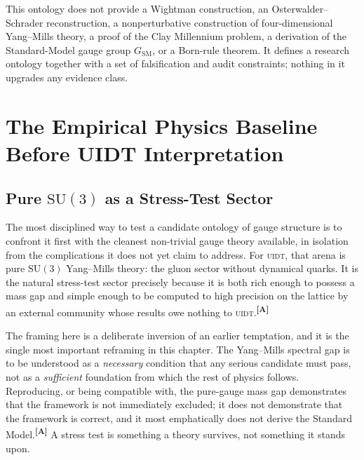 \documentclass[12pt,a4paper,twoside]{article}
\theoremstyle{plain}
\theoremstyle{definition}
\theoremstyle{remark}
\newcommand{\UIDT}{\textsc{uidt}}
\newcommand{\catmark}[1]{\textsuperscript{\textsf{\textbf{[#1]}}}}
\begin{document}
\begin{governancebox}
This ontology does not provide a Wightman construction, an
Osterwalder--Schrader reconstruction, a nonperturbative construction of
four-dimensional Yang--Mills theory, a proof of the Clay Millennium problem,
a derivation of the Standard-Model gauge group $G_{\mathrm{SM}}$, or a
Born-rule theorem. It defines a research ontology together with a set of
falsification and audit constraints; nothing in it upgrades any evidence
class.
\end{governancebox}

\section{The Empirical Physics Baseline Before UIDT Interpretation}
\label{sec:empirical-baseline}

\subsection{Pure \texorpdfstring{$\mathrm{SU}(3)$}{SU(3)} as a Stress-Test Sector}
\label{subsec:su3-stress-test}

The most disciplined way to test a candidate ontology of gauge structure is to confront it first with the cleanest non-trivial gauge theory available, in isolation from the complications it does not yet claim to address. For \UIDT, that arena is pure $\mathrm{SU}(3)$ Yang--Mills theory: the gluon sector without dynamical quarks. It is the natural stress-test sector precisely because it is both rich enough to possess a mass gap and simple enough to be computed to high precision on the lattice by an external community whose results owe nothing to \UIDT.\catmark{A}

The framing here is a deliberate inversion of an earlier temptation, and it is the single most important reframing in this chapter. The Yang--Mills spectral gap is to be understood as a \emph{necessary} condition that any serious candidate must pass, not as a \emph{sufficient} foundation from which the rest of physics follows. Reproducing, or being compatible with, the pure-gauge mass gap demonstrates that the framework is not immediately excluded; it does not demonstrate that the framework is correct, and it most emphatically does not derive the Standard Model.\catmark{A} A stress test is something a theory survives, not something it stands upon.
\end{document}
